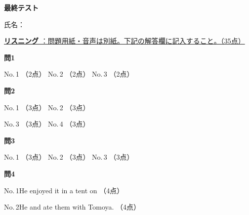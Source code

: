 
\begin{center}
{\Large\textbf{最終テスト}}
\end{center}
\vspace{0.15em}
\begin{flushright}
氏名：\testnameblank
\end{flushright}
\vspace{0.25em}

{\underline{\large\noindent\textbf{リスニング} ：問題用紙・音声は別紙。下記の解答欄に記入すること。（35点）}}
\vspace{0.5em}

\noindent\textbf{問1}
\vspace{0.4em}

\noindent
No.\,1 \listeningchoice[ア]{3.2em}（2点）\qquad
No.\,2 \listeningchoice[ウ]{3.2em}（2点）\qquad
No.\,3 \listeningchoice[ア]{3.2em}（2点）
\testqseplistening

\noindent\textbf{問2}
\vspace{0.4em}

\noindent
No.\,1 \listeningchoice[エ]{3.2em}（3点）\qquad
No.\,2 \listeningchoice[イ]{3.2em}（3点）

\vspace{0.75em}

\noindent
No.\,3 \listeningchoice[ア]{3.2em}（3点）\qquad
No.\,4 \listeningchoice[ウ]{3.2em}（3点）
\testqseplistening

\noindent\textbf{問3}
\vspace{0.4em}

\noindent
No.\,1 \listeningchoice[イ]{3.2em}（3点）\qquad
No.\,2 \listeningchoice[ウ]{3.2em}（3点）\qquad
No.\,3 \listeningchoice[エ]{3.2em}（3点）
\testqseplistening

\noindent\textbf{問4}
\vspace{0.4em}

\noindent No.\,1\quad He enjoyed it in a tent on  （4点）

\vspace{0.85em}

\noindent No.\,2\quad He  and ate them with Tomoya. （4点）

\testsectsep\vspace{1.5em}


